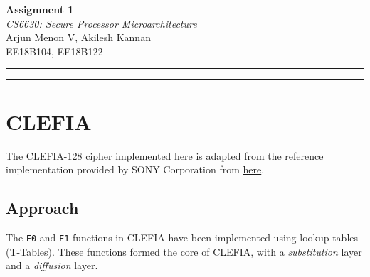 \documentclass[12pt,a4paper,english]{paper}
\def \courseNumber {CS6630}
\def \courseName {Secure Processor Microarchitecture}
\def \assignmentName {Assignment 1}
\def \myName {Arjun Menon V, Akilesh Kannan}
\def \rollNumber {EE18B104, EE18B122}
\newenvironment{warning}{%
  \def\FrameCommand{%
    \hspace{1pt}%
    {\color{red}\vrule width 2pt}%
    {\color{formalred}\vrule width 4pt}%
    \colorbox{formalred}%
  }%
  \MakeFramed{\advance\hsize-\width\FrameRestore}%
  \noindent\hspace{-4.55pt}%
  \begin{adjustwidth}{7pt}{}%
  \vspace{2pt}\vspace{2pt}%
}
{%
  \vspace{2pt}\end{adjustwidth}\endMakeFramed%
}
\begin{document}
\thispagestyle{empty}
\vspace{-4.5cm}

\hspace*{-\parindent}
\begin{minipage}{0.65\textwidth}
\fontsize{22pt}{10pt}\selectfont\textbf{\assignmentName}\\[1mm]
\Large
\textit{\courseNumber: \courseName}\\[5mm]
\Large \myName \\[1mm]
\normalsize \rollNumber \\
\end{minipage}\hfill%

\hrule \hrule
\medskip

\section{CLEFIA}

\begin{warning}
The CLEFIA-128 cipher implemented here is adapted from the reference implementation provided by SONY Corporation from \href{https://www.sony.net/Products/cryptography/clefia/}{here}.
\end{warning}

\subsection{Approach}
The \texttt{F0} and \texttt{F1} functions in CLEFIA have been implemented using lookup tables (T-Tables). These functions formed the core of CLEFIA, with a \textit{substitution} layer and a \textit{diffusion} layer.
\end{document}
